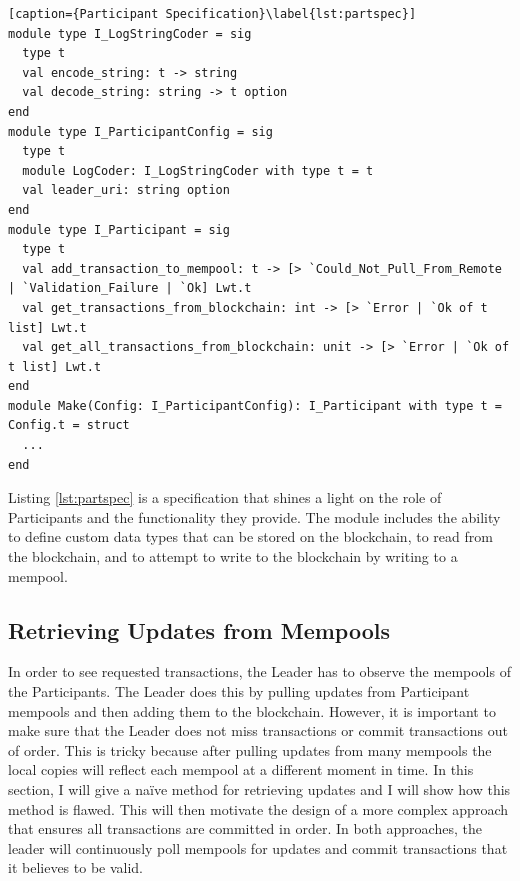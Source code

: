 \documentclass[12pt,a4paper,twoside,openright]{report}
\begin{document}
	\begin{lstlisting}[caption={Participant Specification}\label{lst:partspec}]
module type I_LogStringCoder = sig
  type t
  val encode_string: t -> string
  val decode_string: string -> t option
end
module type I_ParticipantConfig = sig
  type t
  module LogCoder: I_LogStringCoder with type t = t
  val leader_uri: string option
end
module type I_Participant = sig
  type t
  val add_transaction_to_mempool: t -> [> `Could_Not_Pull_From_Remote | `Validation_Failure | `Ok] Lwt.t
  val get_transactions_from_blockchain: int -> [> `Error | `Ok of t list] Lwt.t
  val get_all_transactions_from_blockchain: unit -> [> `Error | `Ok of t list] Lwt.t
end
module Make(Config: I_ParticipantConfig): I_Participant with type t = Config.t = struct
  ...
end
	\end{lstlisting}

	Listing \ref{lst:partspec} is a specification that shines a light on the role of Participants and the functionality they provide.
	The module includes the ability to define custom data types that can be stored on the blockchain, to read from the blockchain, and to attempt to write to the blockchain by writing to a mempool.
	
	\subsection{Retrieving Updates from Mempools}
	In order to see requested transactions, the Leader has to observe the mempools of the Participants. 
	The Leader does this by pulling updates from Participant mempools and then adding them to the blockchain.
	However, it is important to make sure that the Leader does not miss transactions or commit transactions out of order.
	This is tricky because after pulling updates from many mempools the local copies will reflect each mempool at a different moment in time.
	In this section, I will give a na\"{i}ve method for retrieving updates and I will show how this method is flawed. 
	This will then motivate the design of a more complex approach that ensures all transactions are committed in order.
	In both approaches, the leader will continuously poll mempools for updates and commit transactions that it believes to be valid. \\
	
\end{document}
